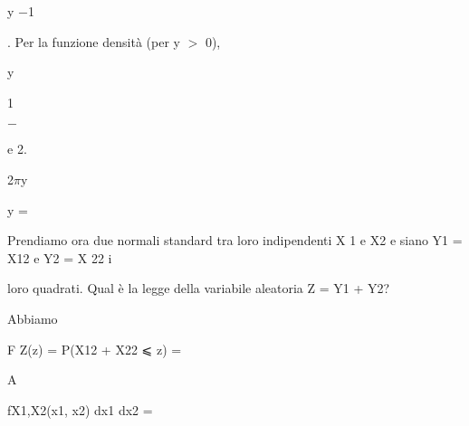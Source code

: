 \documentclass[a4paper,portrait,12pt]{article}
\begin{document}
\begin{flushleft}
y $-$1
\end{flushleft}





\begin{flushleft}
. Per la funzione densit\`{a} (per y $>$ 0),
\end{flushleft}


\begin{flushleft}
y
\end{flushleft}


1


$-$


\begin{flushleft}
e 2.
\end{flushleft}


\begin{flushleft}
2$\pi$y
\end{flushleft}





\begin{flushleft}
y =
\end{flushleft}





\begin{flushleft}
Prendiamo ora due normali standard tra loro indipendenti X 1 e X2 e siano Y1 = X12 e Y2 = X 22 i
\end{flushleft}


\begin{flushleft}
loro quadrati. Qual \`{e} la legge della variabile aleatoria Z = Y1 + Y2?
\end{flushleft}


\begin{flushleft}
Abbiamo
\end{flushleft}


\begin{flushleft}
F Z(z) = P(X12 + X22 ⩽ z) =
\end{flushleft}





\begin{flushleft}
A
\end{flushleft}





\begin{flushleft}
fX1,X2(x1, x2) dx1 dx2 =
\end{flushleft}
\end{document}
